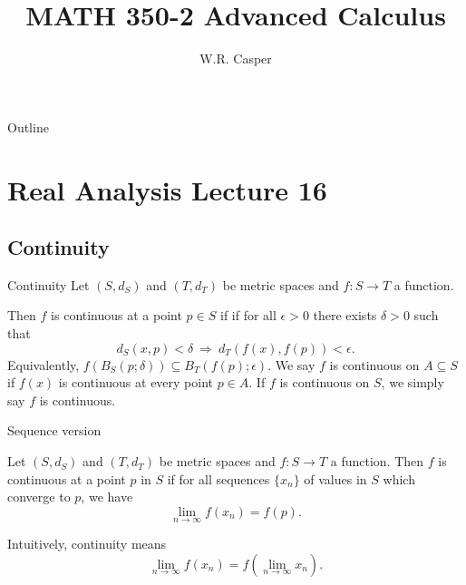 \documentclass{beamer}
\title{MATH 350-2 Advanced Calculus}
\subtitle
{} %
\author[W.R. Casper] %
{W.R. Casper}
\institute[California State University Fullerton] %
{
  Department of Mathematics\\
  California State University Fullerton}
\begin{document}
\begin{frame}
  \titlepage
\end{frame}

\begin{frame}{Outline}
  \tableofcontents
\end{frame}



\section{Real Analysis Lecture 16}

\subsection{Continuity}

\begin{frame}{Continuity}
Let $(S,d_S)$ and $(T,d_T)$ be metric spaces and $f: S\rightarrow T$ a function.
\pause
\begin{defn}
\pause
Then $f$ is continuous at a point $p\in S$ if 
if for all $\epsilon > 0$ there exists $\delta > 0$ such that
$$d_S(x,p) < \delta\ \Rightarrow\ d_T(f(x),f(p)) < \epsilon.$$
\pause
Equivalently, $f(B_S(p;\delta))\subseteq B_T(f(p);\epsilon)$.
\pause
We say $f$ is continuous on $A\subseteq S$ if $f(x)$ is continuous at every point $p\in A$.
\pause
If $f$ is continuous on $S$, we simply say $f$ is continuous.
\end{defn}
\end{frame}

\begin{frame}{Sequence version}
\pause
\begin{thm}
Let $(S,d_S)$ and $(T,d_T)$ be metric spaces and $f: S\rightarrow T$ a function.
\pause
Then $f$ is continuous at a point $p$ in $S$ if for all sequences $\{x_n\}$ of values in $S$ which converge to $p$, we have
\pause
$$\lim_{n\rightarrow\infty} f(x_n) = f(p).$$
\end{thm}
\pause
Intuitively, continuity means
$$\lim_{n\rightarrow\infty} f(x_n) = f\left(\lim_{n\rightarrow\infty} x_n\right).$$
\end{frame}
\end{document}
